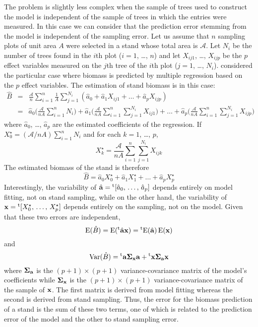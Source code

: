 The problem is slightly less complex when the sample of trees used to construct the model is independent of the sample of trees in which the entries were measured. In this case we can consider that the prediction error stemming from the model is independent of the sampling error. Let us assume that $n$ sampling plots of unit area $A$ were selected in a stand whose total area is $\mathcal{A}$. Let $N_i$ be the number of trees found in the 
$i$th plot ($i=1$, \ldots, $n$) and let
$X_{ij1}$, \ldots, $X_{ijp}$ be the $p$ effect variables measured on the $j$th tree of the $i$th
plot ($j=1$, \ldots, $N_i$). \citet{cunia65,cunia87c} considered the particular case where biomass is predicted by multiple regression based on the $p$ effect variables. The estimation of stand biomass is in this case:
\begin{eqnarray*}
\hat{B} &=&
\frac{\mathcal{A}}{n}\sum_{i=1}^n\frac{1}{A}\sum_{j=1}^{N_i}
(\hat{a}_0+\hat{a}_1X_{ij1}+\ldots+\hat{a}_pX_{ijp})
\\ &=& \hat{a}_0\Big(\frac{\mathcal{A}}{nA}\sum_{i=1}^nN_i\Big)
+\hat{a}_1\Big(\frac{\mathcal{A}}{nA}\sum_{i=1}^n\sum_{j=1}^{N_i}X_{ij1}\Big)
+\ldots+\hat{a}_p\Big(\frac{\mathcal{A}}{nA}\sum_{i=1}^n\sum_{j=1}^{N_i}X_{ijp}\Big)
\end{eqnarray*}
where $\hat{a}_0$, \ldots, $\hat{a}_p$ are the estimated coefficients of the regression. If 
$X^{\star}_0=(\mathcal{A}/nA)\sum_{i=1}^nN_i$ and for each $k=1$,
\ldots, $p$,
\[
X^{\star}_k=\frac{\mathcal{A}}{nA}\sum_{i=1}^n\sum_{j=1}^{N_i}X_{ijk}
\]
The estimated biomass of the stand is therefore
\[
\hat{B}=\hat{a}_0X^{\star}_0+\hat{a}_1X^{\star}_1+\ldots+\hat{a}_pX^{\star}_p
\]
Interestingly, the variability of 
$\hat{\mathbf{a}}={}^{\mathrm{t}}[\hat{a}_0,\,\ldots,\,\hat{a}_p]$ depends entirely on model fitting, not on stand sampling, while on the other hand, the variability of 
$\mathbf{x}={}^{\mathrm{t}}[X^{\star}_0,\,\ldots,\,X^{\star}_p]$ depends entirely on the sampling, not on the model. Given that these two errors are independent,
\[
\mathrm{E}(\hat{B})=\mathrm{E}({}^{\mathrm{t}}\hat{\mathbf{a}}\mathbf{x})
={}^{\mathrm{t}}\mathrm{E}(\hat{\mathbf{a}})\,\mathrm{E}(\mathbf{x})
\]
and
\[
\mathrm{Var}(\hat{B})={}^{\mathrm{t}}\mathbf{a}\boldsymbol{\Sigma}_{\mathbf{x}}
\mathbf{a}+{}^{\mathrm{t}}\mathbf{x}\boldsymbol{\Sigma}_{\mathbf{a}}\mathbf{x}
\]
where $\boldsymbol{\Sigma}_{\mathbf{a}}$ is the
$(p+1)\times(p+1)$ variance-covariance matrix of the model's coefficients while $\boldsymbol{\Sigma}_{\mathbf{x}}$ is the
$(p+1)\times(p+1)$ variance-covariance matrix of the sample of 
$\mathbf{x}$. The first matrix is derived from model fitting whereas the second is derived from stand sampling. Thus, the error for the biomass prediction of a stand is the sum of these two terms, one of which is related to the prediction error of the model and the other to stand sampling error.

